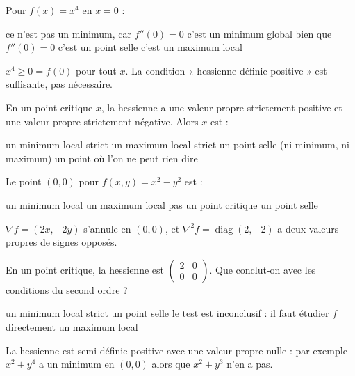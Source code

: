 \begin{question}
Pour $f(x)=x^4$ en $x=0$ :
\begin{reponses}
  \mauvaise ce n'est pas un minimum, car $f''(0)=0$
  \bonne c'est un minimum global bien que $f''(0)=0$
  \mauvaise c'est un point selle
  \mauvaise c'est un maximum local
\end{reponses}
\begin{explication}
$x^4\ge0=f(0)$ pour tout $x$. La condition « hessienne définie positive » est suffisante, pas nécessaire.
\end{explication}
\end{question}

\begin{question}
En un point critique $x$, la hessienne a une valeur propre strictement positive et une valeur propre strictement négative. Alors $x$ est :
\begin{reponses}
  \mauvaise un minimum local strict
  \mauvaise un maximum local strict
  \bonne un point selle (ni minimum, ni maximum)
  \mauvaise un point où l'on ne peut rien dire
\end{reponses}
\end{question}

\begin{question}
Le point $(0,0)$ pour $f(x,y)=x^2-y^2$ est :
\begin{reponses}
  \mauvaise un minimum local
  \mauvaise un maximum local
  \mauvaise pas un point critique
  \bonne un point selle
\end{reponses}
\begin{explication}
$\nabla f=(2x,-2y)$ s'annule en $(0,0)$, et $\nabla^2f=\operatorname{diag}(2,-2)$ a deux valeurs propres de signes opposés.
\end{explication}
\end{question}

\begin{question}
En un point critique, la hessienne est $\begin{pmatrix}2&0\\0&0\end{pmatrix}$. Que conclut-on avec les conditions du second ordre ?
\begin{reponses}
  \mauvaise un minimum local strict
  \mauvaise un point selle
  \bonne le test est inconclusif : il faut étudier $f$ directement
  \mauvaise un maximum local
\end{reponses}
\begin{explication}
La hessienne est semi-définie positive avec une valeur propre nulle : par exemple $x^2+y^4$ a un minimum en $(0,0)$ alors que $x^2+y^3$ n'en a pas.
\end{explication}
\end{question}

